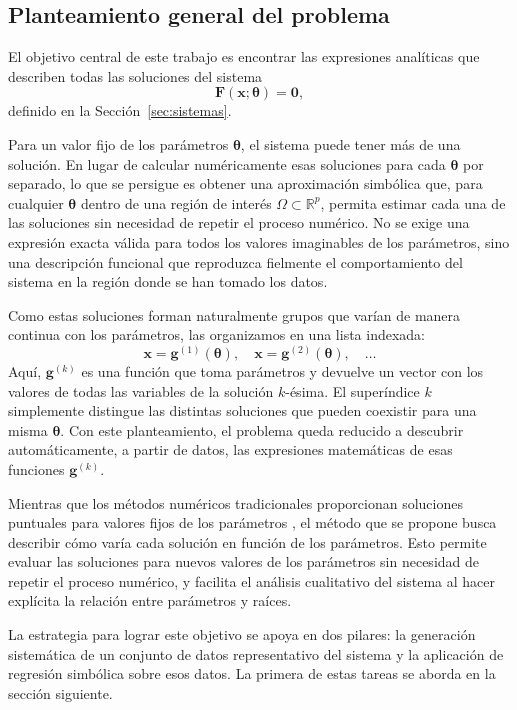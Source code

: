 \documentclass[12pt,a4paper]{article} \usepackage[utf8]{inputenc} \usepackage[spanish]{babel} \usepackage{amsmath, amssymb, amsthm} \usepackage{bm} \usepackage{float} \usepackage{longtable} \usepackage[hidelinks]{hyperref}
\newcommand{\xvec}{\mathbf{x}} \newcommand{\thetavec}{\boldsymbol{\theta}} \newcommand{\Fvec}{\mathbf{F}} \newcommand{\R}{\mathbb{R}} \newcommand{\norm}[1]{\left\lVert#1\right\rVert} \newcommand{\loss}{\mathcal{L}} \newcommand{\dataset}{\mathcal{D}} \newcommand{\jac}{\mathbf{J}}
\begin{document}
\subsection{Planteamiento general del problema}
\label{sec:planteamiento}

El objetivo central de este trabajo es encontrar las expresiones
analíticas que describen todas las soluciones del sistema
\begin{equation}
    \Fvec(\xvec; \thetavec) = \mathbf{0},
    \label{eq:problema_original}
\end{equation}
definido en la Sección~\ref{sec:sistemas}.

Para un valor fijo de los parámetros \(\thetavec\), el sistema puede
tener más de una solución. En lugar de calcular numéricamente esas
soluciones para cada \(\thetavec\) por separado, lo que se persigue es
obtener una aproximación simbólica que, para cualquier \(\thetavec\)
dentro de una región de interés \(\Omega \subset \R^p\), permita
estimar cada una de las soluciones sin necesidad de repetir el proceso
numérico. No se exige una expresión exacta válida para todos los
valores imaginables de los parámetros, sino una descripción funcional
que reproduzca fielmente el comportamiento del sistema en la región
donde se han tomado los datos.

Como estas soluciones forman naturalmente grupos que varían de manera
continua con los parámetros, las organizamos en una lista indexada:
\[
\xvec = \mathbf{g}^{(1)}(\thetavec),\quad
\xvec = \mathbf{g}^{(2)}(\thetavec),\quad \dots
\]
Aquí, \(\mathbf{g}^{(k)}\) es una función que toma parámetros y
devuelve un vector con los valores de todas las variables de la
solución \(k\)-ésima. El superíndice \(k\) simplemente distingue las
distintas soluciones que pueden coexistir para una misma
\(\thetavec\). Con este planteamiento, el problema queda reducido a
descubrir automáticamente, a partir de datos, las expresiones
matemáticas de esas funciones \(\mathbf{g}^{(k)}\).

Mientras que los métodos numéricos tradicionales proporcionan
soluciones puntuales para valores fijos de los parámetros
\cite{burden2010numerical}, el método que se propone busca describir
cómo varía cada solución en función de los parámetros. Esto permite
evaluar las soluciones para nuevos valores de los parámetros sin
necesidad de repetir el proceso numérico, y facilita el análisis
cualitativo del sistema al hacer explícita la relación entre parámetros
y raíces.

La estrategia para lograr este objetivo se apoya en dos pilares: la
generación sistemática de un conjunto de datos representativo del
sistema y la aplicación de regresión simbólica sobre esos datos. La
primera de estas tareas se aborda en la sección siguiente.
\end{document}
